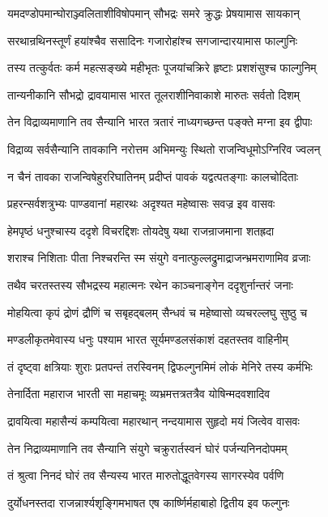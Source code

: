\twolineshloka
{यमदण्डोपमान्घोराञ्ज्वलिताशीविषोपमान्}
{सौभद्रः समरे क्रुद्धः प्रेषयामास सायकान्}


\twolineshloka
{सरथान्रथिनस्तूर्णं हयांश्चैव ससादिनः}
{गजारोहांश्च सगजान्दारयामास फाल्गुनिः}


\twolineshloka
{तस्य तत्कुर्वतः कर्म महत्सङ्ख्ये महीभृतः}
{पूजयांचक्रिरे हृष्टाः प्रशशंसुश्च फाल्गुनिम्}


\twolineshloka
{तान्यनीकानि सौभद्रो द्रावयामास भारत}
{तूलराशीनिवाकाशे मारुतः सर्वतो दिशम्}


\twolineshloka
{तेन विद्राव्यमाणानि तव सैन्यानि भारत}
{त्रतारं नाध्यगच्छन्त पङ्क्ते मग्ना इव द्वीपाः}


\twolineshloka
{विद्राव्य सर्वसैन्यानि तावकानि नरोत्तम}
{अभिमन्युः स्थितो राजन्विधूमोऽग्निरिव ज्वलन्}


\twolineshloka
{न चैनं तावका राजन्विषेहुररिघातिनम्}
{प्रदीप्तं पावकं यद्वत्पतङ्गाः कालचोदिताः}


\twolineshloka
{प्रहरन्सर्वशत्रुभ्यः पाण्डवानां महारथः}
{अदृश्यत महेष्वासः सवज्र इव वासवः}


\twolineshloka
{हेमपृष्ठं धनुश्चास्य ददृशे विचरद्दिशः}
{तोयदेषु यथा राजन्राजमाना शतह्रदा}


\twolineshloka
{शराश्च निशिताः पीता निश्चरन्ति स्म संयुगे}
{वनात्फुल्लद्रुमाद्राजन्भ्रमराणामिव व्रजाः}


\twolineshloka
{तथैव चरतस्तस्य सौभद्रस्य महात्मनः}
{रथेन काञ्चनाङ्गेन ददृशुर्नान्तरं जनाः}


\twolineshloka
{मोहयित्वा कृपं द्रोणं द्रौणिं च सबृहद्बलम्}
{सैन्धवं च महेष्वासो व्यचरल्लघु सुष्ठु च}


\twolineshloka
{मण्डलीकृतमेवास्य धनुः पश्याम भारत}
{सूर्यमण्डलसंकाशं दहतस्तव वाहिनीम्}


\twolineshloka
{तं दृष्ट्वा क्षत्रियाः शुराः प्रतपन्तं तरस्विनम्}
{द्विफल्गुनमिमं लोकं मेनिरे तस्य कर्मभिः}


\twolineshloka
{तेनार्दिता महाराज भारती सा महाचमूः}
{व्यभ्रमत्तत्रतत्रैव योषिन्मदवशादिव}


\twolineshloka
{द्रावयित्वा महासैन्यं कम्पयित्वा महारथान्}
{नन्दयामास सुहृदो मयं जित्वेव वासवः}


\twolineshloka
{तेन निद्राव्यमाणानि तव सैन्यानि संयुगे}
{चक्रुरार्तस्वनं घोरं पर्जन्यनिनदोपमम्}


\twolineshloka
{तं श्रुत्वा निनदं घोरं तव सैन्यस्य भारत}
{मारुतोद्धूतवेगस्य सागरस्येव पर्वणि}


\twolineshloka
{दुर्योधनस्तदा राजन्नार्श्यशृङ्गिमभाषत}
{एष कार्ष्णिर्महाबाहो द्वितीय इव फल्गुनः}


